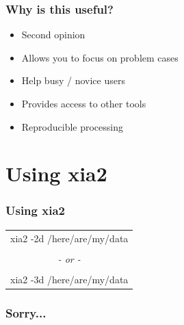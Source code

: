 \documentclass[slides,compress]{beamer}
\begin{document}
\begin{frame}
\frametitle{Why is this useful?}
\begin{itemize}
\item{Second opinion}
\item{Allows you to focus on problem cases}
\item{Help  busy / novice users}
\item{Provides access to other tools}
\item{Reproducible processing}
\end{itemize}
\end{frame}

\section{Using xia2}

\begin{frame}
\frametitle{Using xia2}
\begin{center}
\begin{tabular}{c}
{\huge
xia2 -2d /here/are/my/data
}\\
\\
{\huge \emph{- or -}} \\
\\
{\huge
xia2 -3d /here/are/my/data
}\\
\end{tabular}
\end{center}
\end{frame}

\begin{frame}
\frametitle{Sorry...}
\end{frame}
\end{document}
